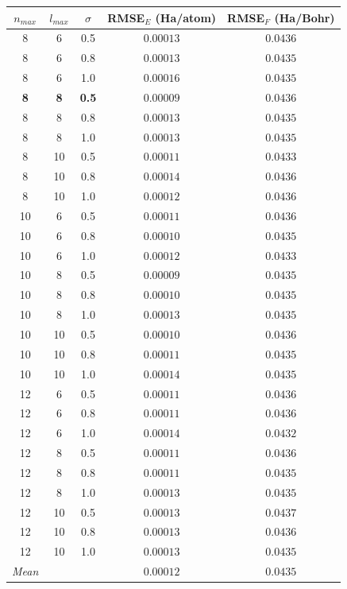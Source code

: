 \begin{tabular}{ccccc}
\toprule
$n_{max}$ & $l_{max}$ & $\sigma$ & RMSE$_E$ (Ha/atom) & RMSE$_F$ (Ha/Bohr) \\
\midrule
8 & 6 & 0.5 & $0.00013$ & $0.0436$ \\
8 & 6 & 0.8 & $0.00013$ & $0.0435$ \\
8 & 6 & 1.0 & $0.00016$ & $0.0435$ \\
\textbf{8} & \textbf{8} & \textbf{0.5} & \textbf{$0.00009$} & \textbf{$0.0436$} \\
8 & 8 & 0.8 & $0.00013$ & $0.0435$ \\
8 & 8 & 1.0 & $0.00013$ & $0.0435$ \\
8 & 10 & 0.5 & $0.00011$ & $0.0433$ \\
8 & 10 & 0.8 & $0.00014$ & $0.0436$ \\
8 & 10 & 1.0 & $0.00012$ & $0.0436$ \\
10 & 6 & 0.5 & $0.00011$ & $0.0436$ \\
10 & 6 & 0.8 & $0.00010$ & $0.0435$ \\
10 & 6 & 1.0 & $0.00012$ & $0.0433$ \\
10 & 8 & 0.5 & $0.00009$ & $0.0435$ \\
10 & 8 & 0.8 & $0.00010$ & $0.0435$ \\
10 & 8 & 1.0 & $0.00013$ & $0.0435$ \\
10 & 10 & 0.5 & $0.00010$ & $0.0436$ \\
10 & 10 & 0.8 & $0.00011$ & $0.0435$ \\
10 & 10 & 1.0 & $0.00014$ & $0.0435$ \\
12 & 6 & 0.5 & $0.00011$ & $0.0436$ \\
12 & 6 & 0.8 & $0.00011$ & $0.0436$ \\
12 & 6 & 1.0 & $0.00014$ & $0.0432$ \\
12 & 8 & 0.5 & $0.00011$ & $0.0436$ \\
12 & 8 & 0.8 & $0.00011$ & $0.0435$ \\
12 & 8 & 1.0 & $0.00013$ & $0.0435$ \\
12 & 10 & 0.5 & $0.00013$ & $0.0437$ \\
12 & 10 & 0.8 & $0.00013$ & $0.0436$ \\
12 & 10 & 1.0 & $0.00013$ & $0.0435$ \\
\midrule
\textit{Mean} & & & \textit{$0.00012$} & \textit{$0.0435$} \\
\bottomrule
\end{tabular}

